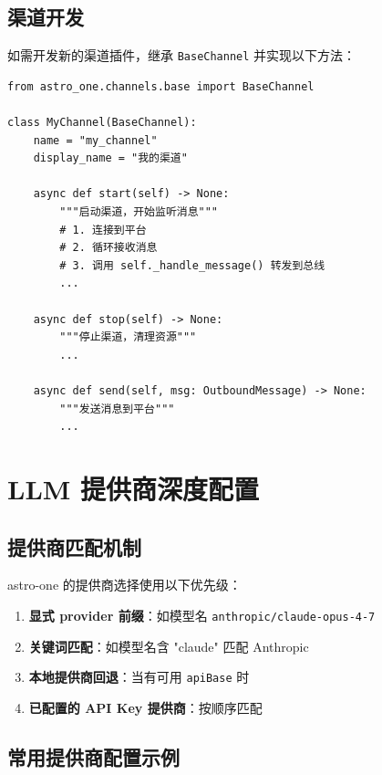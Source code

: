 \documentclass[12pt,a4paper,UTF8]{ctexart}
\begin{document}
\section{渠道开发}

如需开发新的渠道插件，继承 \texttt{BaseChannel} 并实现以下方法：

\begin{verbatim}
from astro_one.channels.base import BaseChannel

class MyChannel(BaseChannel):
    name = "my_channel"
    display_name = "我的渠道"

    async def start(self) -> None:
        """启动渠道，开始监听消息"""
        # 1. 连接到平台
        # 2. 循环接收消息
        # 3. 调用 self._handle_message() 转发到总线
        ...

    async def stop(self) -> None:
        """停止渠道，清理资源"""
        ...

    async def send(self, msg: OutboundMessage) -> None:
        """发送消息到平台"""
        ...
\end{verbatim}

\chapter{LLM 提供商深度配置}

\section{提供商匹配机制}

astro-one 的提供商选择使用以下优先级：
\begin{enumerate}
    \item \textbf{显式 provider 前缀}：如模型名 \texttt{anthropic/claude-opus-4-7}
    \item \textbf{关键词匹配}：如模型名含 "claude" 匹配 Anthropic
    \item \textbf{本地提供商回退}：当有可用 \texttt{apiBase} 时
    \item \textbf{已配置的 API Key 提供商}：按顺序匹配
\end{enumerate}

\section{常用提供商配置示例}
\end{document}
